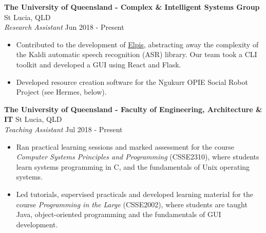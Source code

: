 \documentclass[a4paper]{article}
\newenvironment{myitemize}
{   \small
    \vspace{-2pt}
    \begin{itemize}
    \setlength{\itemsep}{0pt}
    \setlength{\parskip}{0pt}
    \setlength{\parsep}{0pt}     }
{ \end{itemize}                  }
\begin{document}
\textbf{The University of Queensland - Complex \& Intelligent Systems Group} \hfill St Lucia, QLD\\
\textit{Research Assistant} \hfill Jun 2018 - Present\\
\begin{myitemize} \itemsep 0.5mm
	\item Contributed to the development of \href{https://github.com/CoEDL/elpis}{Elpis}, abstracting away the complexity of the Kaldi automatic speech recognition (ASR) library. Our team took a CLI toolkit and developed a GUI using React and Flask.
	\item Developed resource creation software for the Ngukurr OPIE Social Robot Project (see Hermes, below). 
\end{myitemize}

\textbf{The University of Queensland - Faculty of Engineering, Architecture \& IT} \hfill St Lucia, QLD\\
\textit{Teaching Assistant} \hfill Jul 2018 - Present\\
\vspace{-0.5mm}
\begin{myitemize} \itemsep 0.5mm
	\item Ran practical learning sessions and marked assessment for the course \textit{Computer Systems Principles and Programming} (CSSE2310),  where students learn systems programming in C, and the fundamentals of Unix operating systems.
	\item Led tutorials, supervised practicals and developed learning material for the course \textit{Programming in the Large} (CSSE2002), where students are taught Java, object-oriented programming and the fundamentals of GUI development.
\end{myitemize}
\end{document}
